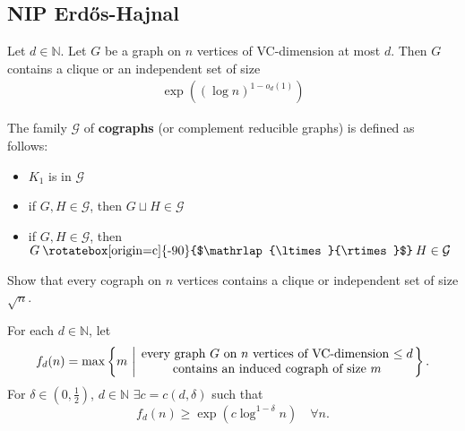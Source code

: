 \documentclass{article}
\newcommand{\named}[1]{\textbf{#1}\index{#1}}
\newcommand{\cross}{\mathbin{\text{\rotatebox[origin=c]{-90}{$\mathrlap{\ltimes}{\rtimes}$}}}}
\begin{document}
\subsection{NIP \texorpdfstring{Erd\H{o}s}{Erdos}-Hajnal}
\begin{thm}
  Let $d \in \mathbb{N}$. Let $G$ be a graph on $n$ vertices of VC-dimension at most $d$.
  Then $G$ contains a clique or an independent set of size
  \begin{align*}
    \exp((\log n)^{1 - o_d(1)})
  \end{align*}
\end{thm}
\begin{defi}
  The family $\mathcal{G}$ of \named{cographs} (or complement reducible graphs) is defined as follows:
  \begin{itemize}
    \item $K_1$ is in $\mathcal{G}$
    \item if $G,H \in \mathcal{G}$, then $G \sqcup H \in \mathcal{G}$
    \item if $G,H \in \mathcal{G}$, then $G \cross H \in \mathcal{G}$
  \end{itemize}
\end{defi}
\begin{ex}
  Show that every cograph on $n$ vertices contains a clique or independent set of size $\sqrt{n}$.
\end{ex}
\begin{thm}
  \newlec
  For each $d \in \mathbb{N}$, let
  \begin{align*}
    f_d(n) = \max\left\{m\ \middle\vert\ \parbox{22em}{\centering every graph $G$ on $n$ vertices of VC-dimension $\leq d$ \\ contains an induced cograph of size $m$}\right\}.
  \end{align*}
  For $\delta \in (0,\frac 12)$, $d \in \mathbb{N}$ $\exists c = c(d,\delta)$ such that
  \begin{equation*}
  f_d(n) \geq \exp(c \log^{1-\delta}n) \quad \forall n.
  \end{equation*}
\end{thm}
\end{document}
